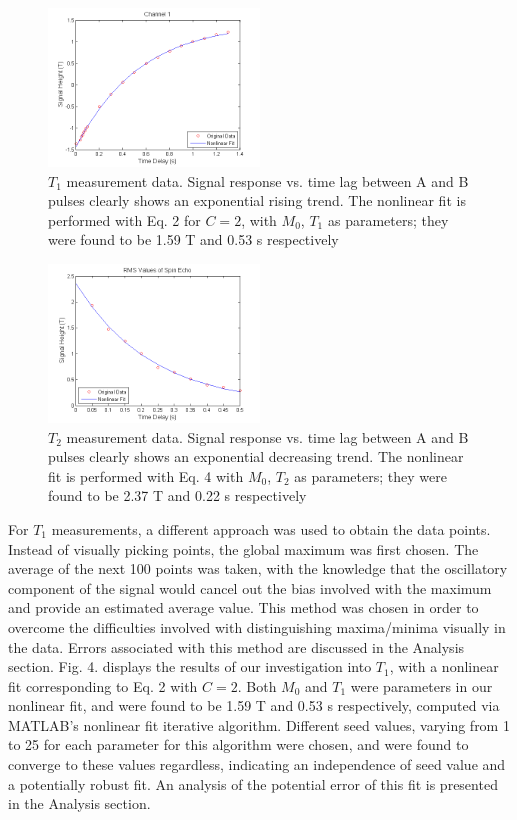 \documentclass[aps,prl,nofootinbib,twocolumn,superscriptaddress,groupedaddress]{revtex4}  %
\begin{document}
\begin{figure}[t]
\centering
\includegraphics[width=0.5\textwidth]{../Analysis/T1.png} 
\caption{$T_{1}$ measurement data. Signal response vs. time lag between A and B pulses clearly shows an exponential rising trend. The nonlinear fit is performed with Eq. 2 for $C = 2$, with $M_{0}$, $T_{1}$ as parameters; they  were found to be 1.59 T and 0.53 s respectively} 
\end{figure}

\begin{figure}[b]
\centering
\includegraphics[width=0.5\textwidth]{../Analysis/T2.png} 
\caption{$T_{2}$ measurement data. Signal response vs. time lag between A and B pulses clearly shows an exponential decreasing trend. The nonlinear fit is performed with Eq. 4 with $M_{0}$, $T_{2}$ as parameters; they  were found to be 2.37 T and 0.22 s respectively} 
\end{figure}

For $T_{1}$ measurements, a different approach was used to obtain the data points. Instead of visually picking points, the global maximum was first chosen. The average of the next 100 points was taken, with the knowledge that the oscillatory component of the signal would cancel out the bias involved with the maximum and provide an estimated average value. This method was chosen in order to overcome the difficulties involved with distinguishing maxima/minima visually in the data. Errors associated with this method are discussed in the Analysis section. Fig. 4. displays the results of our investigation into $T_{1}$, with a nonlinear fit corresponding to Eq. 2 with $C = 2$. Both $M_{0}$ and $T_{1}$ were parameters in our nonlinear fit, and were found to be 1.59 T and 0.53 s respectively, computed via MATLAB's nonlinear fit iterative algorithm. Different seed values, varying from 1 to 25 for each parameter for this algorithm were chosen, and were found to converge to these values regardless, indicating an independence of seed value and a potentially robust fit. An analysis of the potential error of this fit is presented in the Analysis section.
\end{document}
